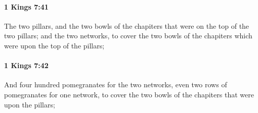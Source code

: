 		\paragraph{1 Kings 7:41} %
			\label{1KINGS-7-41}

			The two pillars, and the two bowls of the chapiters that were on the top of the two pillars; and the two networks, to cover the two bowls of the chapiters which were upon the top of the pillars;


		\paragraph{1 Kings 7:42} %
			\label{1KINGS-7-42}

			And four hundred pomegranates for the two networks, even two rows of pomegranates for one network, to cover the two bowls of the chapiters that were upon the pillars;


